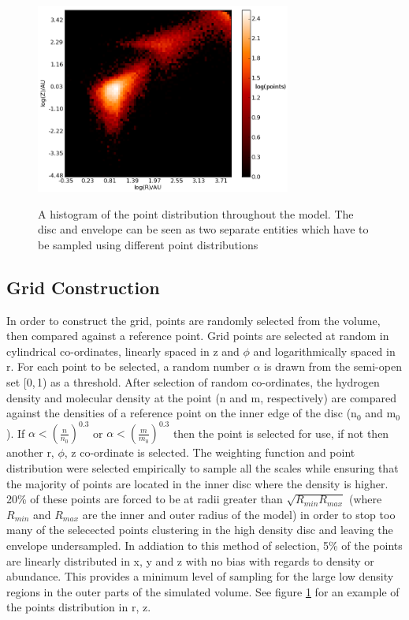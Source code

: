 \documentclass[useAMS,usenatbib]{mn2e}
\begin{document}
\begin{figure}
 \includegraphics[width=84mm]{Figures/model/lime_points_rz_histo.png}
 \label{points}
 \caption{A histogram of the point distribution throughout the model. The disc and envelope can be seen as two separate entities which have to be sampled using different point distributions}
\end{figure}

\subsection{Grid Construction} \label{subsec:gridding}
In order to construct the grid, points are randomly selected from the volume, then compared against a reference point. Grid points are selected at random in cylindrical co-ordinates, linearly spaced in z and $\phi$ and logarithmically spaced in r. For each point to be selected, a random number $\alpha$ is drawn from the semi-open set [0,$\,$1) as a threshold. After selection of random co-ordinates, the hydrogen density and molecular density at the point (n and m, respectively) are compared against the densities of a reference point on the inner edge of the disc (n$_0$ and m$_0$). If $\alpha<\left( \frac{n}{n_0} \right)^{0.3}$ or $\alpha< \left( \frac{m}{m_0} \right)^{0.3}$ then the point is selected for use, if not then another r, $\phi$, z co-ordinate is selected. The weighting function and point distribution were selected empirically to sample all the scales while ensuring that the majority of points are located in the inner disc where the density is higher. 20\% of these points are forced to be at radii greater than $\sqrt{R_{min}R_{max}}$ (where $R_{min}$ and $R_{max}$ are the inner and outer radius of the model) in order to stop too many of the selecected points clustering in the high density disc and leaving the envelope undersampled. In addiation to this method of selection, 5\% of the points are linearly distributed in x, y and z with no bias with regards to density or abundance. This provides a minimum level of sampling for the large low density regions in the outer parts of the simulated volume. See figure \ref{points} for an example of the points distribution in r, z. \newline
\end{document}
